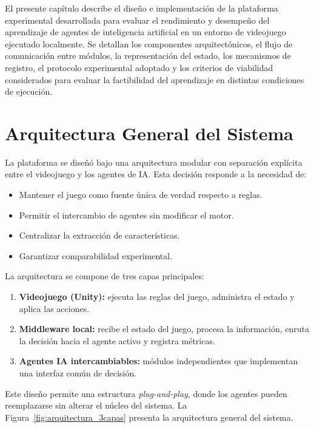 El presente capítulo describe el diseño e implementación de la plataforma experimental desarrollada para evaluar el rendimiento y desempeño del aprendizaje de agentes de inteligencia artificial en un entorno de videojuego ejecutado localmente. Se detallan los componentes arquitectónicos, el flujo de comunicación entre módulos, la representación del estado, los mecanismos de registro, el protocolo experimental adoptado y los criterios de viabilidad considerados para evaluar la factibilidad del aprendizaje en distintas condiciones de ejecución.

\section{Arquitectura General del Sistema}

La plataforma se diseñó bajo una arquitectura modular con separación explícita entre el videojuego y los agentes de IA. Esta decisión responde a la necesidad de:

\begin{itemize}
    \item Mantener el juego como fuente única de verdad respecto a reglas.
    \item Permitir el intercambio de agentes sin modificar el motor.
    \item Centralizar la extracción de características.
    \item Garantizar comparabilidad experimental.
\end{itemize}

La arquitectura se compone de tres capas principales:

\begin{enumerate}
    \item \textbf{Videojuego (Unity):} ejecuta las reglas del juego, administra el estado y aplica las acciones.
    \item \textbf{Middleware local:} recibe el estado del juego, procesa la información, enruta la decisión hacia el agente activo y registra métricas.
    \item \textbf{Agentes IA intercambiables:} módulos independientes que implementan una interfaz común de decisión.
\end{enumerate}

Este diseño permite una estructura \textit{plug-and-play}, donde los agentes pueden reemplazarse sin alterar el núcleo del sistema. La Figura~\ref{fig:arquitectura_3capas} presenta la arquitectura general del sistema.

